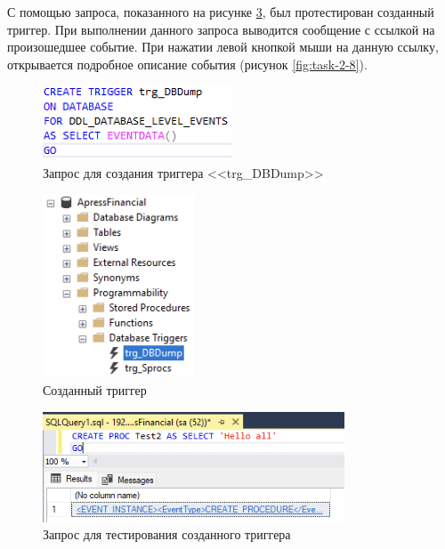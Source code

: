\documentclass[a4paper, 14pt]{extarticle}
\begin{document}
С помощью запроса, показанного на рисунке \ref{fig:task-2-7}, был протестирован
созданный триггер. При выполнении данного запроса выводится сообщение с ссылкой
на произошедшее событие. При нажатии левой кнопкой мыши на данную ссылку,
открывается подробное описание события (рисунок \ref{fig:task-2-8}).

\begin{figure}[H]
  \centering
  \includegraphics[width=0.5\textwidth]{images/task-2/5.png}
  \caption{
    Запрос для создания триггера <<\foreignlanguage{english}{trg\_DBDump}>>
  }
  \label{fig:task-2-5}
\end{figure}

\begin{figure}[H]
  \centering
  \includegraphics[width=0.4\textwidth]{images/task-2/6.png}
  \caption{Созданный триггер}
  \label{fig:task-2-6}
\end{figure}

\begin{figure}[H]
  \centering
  \includegraphics[width=0.8\textwidth]{images/task-2/7.png}
  \caption{Запрос для тестирования созданного триггера}
  \label{fig:task-2-7}
\end{figure}
\end{document}
